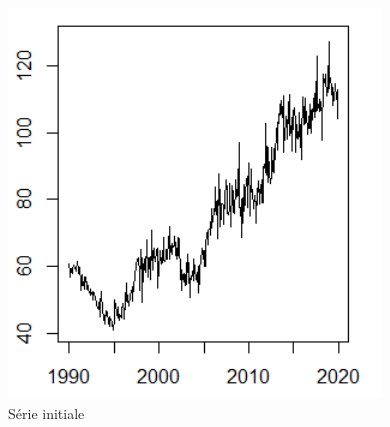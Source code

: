 \documentclass[a4paper, 12pt]{article} %
\begin{document}
\begin{figure}[h]
    \centering
    \includegraphics[scale =0.7]{serie_ae.png}
    \caption{Série initiale}
\end{figure}
\end{document}
